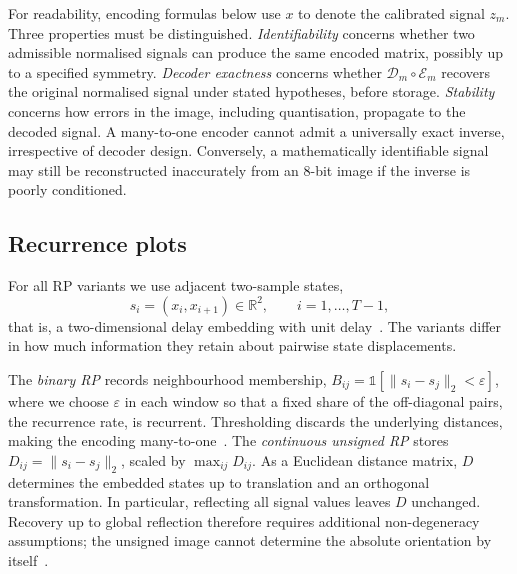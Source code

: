 \documentclass[preprint,review,12pt]{elsarticle}
\begin{document}
For readability, encoding formulas below use $x$ to denote the calibrated signal $z_m$. Three properties must be distinguished. \emph{Identifiability} concerns whether two admissible normalised signals can produce the same encoded matrix, possibly up to a specified symmetry. \emph{Decoder exactness} concerns whether $\mathcal D_m\circ\mathcal E_m$ recovers the original normalised signal under stated hypotheses, before storage. \emph{Stability} concerns how errors in the image, including quantisation, propagate to the decoded signal. A many-to-one encoder cannot admit a universally exact inverse, irrespective of decoder design. Conversely, a mathematically identifiable signal may still be reconstructed inaccurately from an 8-bit image if the inverse is poorly conditioned.

\subsection{Recurrence plots}\label{sec:rp_encodings}

For all RP variants we use adjacent two-sample states,
\[
s_i=(x_i,x_{i+1})\in\mathbb R^2,\qquad i=1,\ldots,T-1,
\]
that is, a two-dimensional delay embedding with unit delay~\cite{takens1981detecting}. The variants differ in how much information they retain about pairwise state displacements.

The \emph{binary RP} records neighbourhood membership,
$B_{ij}=\mathbb 1[\lVert s_i-s_j\rVert_2<\varepsilon]$, where we choose $\varepsilon$ in each window so that a fixed share of the off-diagonal pairs, the recurrence rate, is recurrent.
Thresholding discards the underlying distances, making the encoding many-to-one~\cite{eckmann1987recurrence,marwan2007recurrence}.
The \emph{continuous unsigned RP} stores
$D_{ij}=\lVert s_i-s_j\rVert_2$, scaled by $\max_{ij}D_{ij}$.
As a Euclidean distance matrix, $D$ determines the embedded states up to translation and an orthogonal transformation. In particular, reflecting all signal values leaves $D$ unchanged. Recovery up to global reflection therefore requires additional non-degeneracy assumptions; the unsigned image cannot determine the absolute orientation by itself~\cite{sipers2011unique}.
\end{document}
